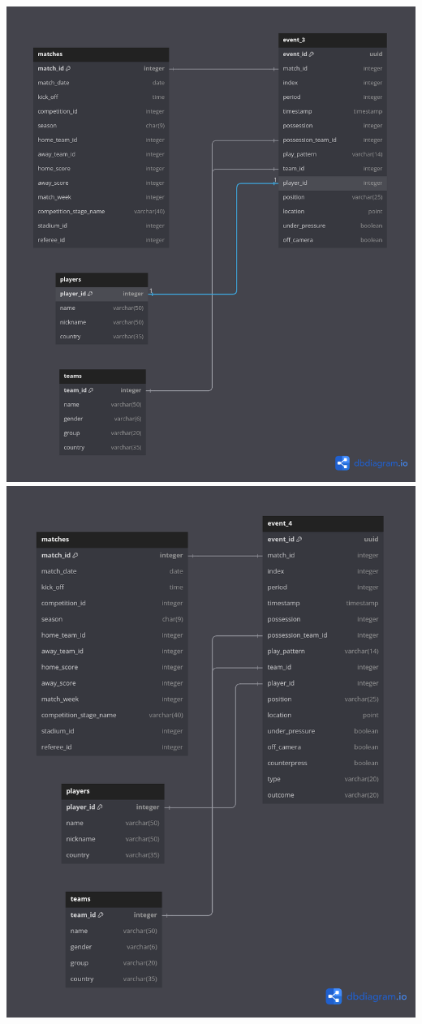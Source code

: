 \documentclass[12pt]{article}
\begin{document}
\includegraphics[width=\textwidth]{schema-diagram/event_3.png}
\includegraphics[width=\textwidth]{schema-diagram/event_4.png}
\end{document}
